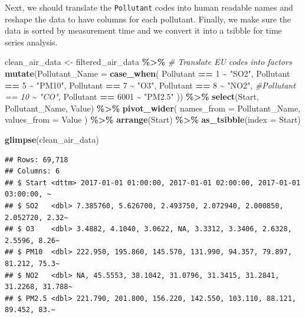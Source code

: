 \documentclass[
]{article}
\newenvironment{Shaded}{\begin{snugshade}}{\end{snugshade}}
\newcommand{\AttributeTok}[1]{\textcolor[rgb]{0.13,0.29,0.53}{#1}}
\newcommand{\CommentTok}[1]{\textcolor[rgb]{0.56,0.35,0.01}{\textit{#1}}}
\newcommand{\DecValTok}[1]{\textcolor[rgb]{0.00,0.00,0.81}{#1}}
\newcommand{\FunctionTok}[1]{\textcolor[rgb]{0.13,0.29,0.53}{\textbf{#1}}}
\newcommand{\NormalTok}[1]{#1}
\newcommand{\OtherTok}[1]{\textcolor[rgb]{0.56,0.35,0.01}{#1}}
\newcommand{\SpecialCharTok}[1]{\textcolor[rgb]{0.81,0.36,0.00}{\textbf{#1}}}
\newcommand{\StringTok}[1]{\textcolor[rgb]{0.31,0.60,0.02}{#1}}
\begin{document}
Next, we should translate the \texttt{Pollutant} codes into human
readable names and reshape the data to have columns for each pollutant.
Finally, we make sure the data is sorted by measurement time and we
convert it into a tsibble for time series analysis.

\begin{Shaded}
\begin{Highlighting}[]
\NormalTok{clean\_air\_data }\OtherTok{\textless{}{-}}\NormalTok{ filtered\_air\_data }\SpecialCharTok{\%\textgreater{}\%}
  \CommentTok{\# Translate EU codes into factors}
  \FunctionTok{mutate}\NormalTok{(}\AttributeTok{Pollutant\_Name =} \FunctionTok{case\_when}\NormalTok{(}
\NormalTok{    Pollutant }\SpecialCharTok{==} \DecValTok{1} \SpecialCharTok{\textasciitilde{}} \StringTok{"SO2"}\NormalTok{,}
\NormalTok{    Pollutant }\SpecialCharTok{==} \DecValTok{5} \SpecialCharTok{\textasciitilde{}} \StringTok{"PM10"}\NormalTok{,}
\NormalTok{    Pollutant }\SpecialCharTok{==} \DecValTok{7} \SpecialCharTok{\textasciitilde{}} \StringTok{"O3"}\NormalTok{,}
\NormalTok{    Pollutant }\SpecialCharTok{==} \DecValTok{8} \SpecialCharTok{\textasciitilde{}} \StringTok{"NO2"}\NormalTok{,}
    \CommentTok{\#Pollutant == 10 \textasciitilde{} "CO",}
\NormalTok{    Pollutant }\SpecialCharTok{==} \DecValTok{6001} \SpecialCharTok{\textasciitilde{}} \StringTok{"PM2.5"}
\NormalTok{  )) }\SpecialCharTok{\%\textgreater{}\%}
  \FunctionTok{select}\NormalTok{(Start, Pollutant\_Name, Value) }\SpecialCharTok{\%\textgreater{}\%}
  \FunctionTok{pivot\_wider}\NormalTok{(}
    \AttributeTok{names\_from =}\NormalTok{ Pollutant\_Name, }
    \AttributeTok{values\_from =}\NormalTok{ Value}
\NormalTok{  ) }\SpecialCharTok{\%\textgreater{}\%}
  \FunctionTok{arrange}\NormalTok{(Start) }\SpecialCharTok{\%\textgreater{}\%}
  \FunctionTok{as\_tsibble}\NormalTok{(}\AttributeTok{index =}\NormalTok{ Start)}

\FunctionTok{glimpse}\NormalTok{(clean\_air\_data)}
\end{Highlighting}
\end{Shaded}

\begin{verbatim}
## Rows: 69,718
## Columns: 6
## $ Start <dttm> 2017-01-01 01:00:00, 2017-01-01 02:00:00, 2017-01-01 03:00:00, ~
## $ SO2   <dbl> 7.385760, 5.626700, 2.493750, 2.072940, 2.000850, 2.052720, 2.32~
## $ O3    <dbl> 3.4882, 4.1040, 3.0622, NA, 3.3312, 3.3406, 2.6328, 2.5596, 8.26~
## $ PM10  <dbl> 222.950, 195.860, 145.570, 131.990, 94.357, 79.897, 81.212, 75.3~
## $ NO2   <dbl> NA, 45.5553, 38.1042, 31.0796, 31.3415, 31.2841, 31.2268, 31.788~
## $ PM2.5 <dbl> 221.790, 201.800, 156.220, 142.550, 103.110, 88.121, 89.452, 83.~
\end{verbatim}
\end{document}
